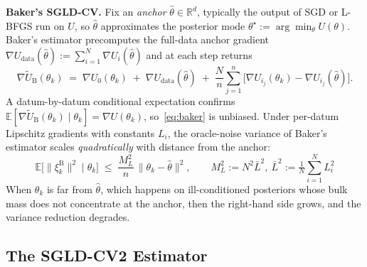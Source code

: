 \textbf{Baker's SGLD-CV.} Fix an \emph{anchor} $\hat\theta\in\mathbb R^d$, typically the output of SGD or L-BFGS run on $U$, so $\hat\theta$ approximates the posterior mode $\theta^\star:=\arg\min_\theta U(\theta)$. Baker's estimator precomputes the full-data anchor gradient $\nabla U_{\text{data}}(\hat\theta):=\sum_{i=1}^N\nabla U_i(\hat\theta)$ and at each step returns
\begin{equation}
  \nabla\tilde U_{\mathrm B}(\theta_k) \;=\; \nabla U_0(\theta_k) \;+\; \nabla U_{\text{data}}(\hat\theta) \;+\; \frac{N}{n}\sum_{j=1}^n\bigl[\nabla U_{i_j}(\theta_k) - \nabla U_{i_j}(\hat\theta)\bigr].
  \label{eq:baker}
\end{equation}
A datum-by-datum conditional expectation confirms $\mathbb E[\nabla\tilde U_{\mathrm B}(\theta_k)\mid\theta_k]=\nabla U(\theta_k)$, so~\eqref{eq:baker} is unbiased. Under per-datum Lipschitz gradients with constants $L_i$, the oracle-noise variance of Baker's estimator scales \emph{quadratically} with distance from the anchor:
\begin{equation}
  \mathbb E\bigl[\|\xi_k^{\mathrm B}\|^2\mid\theta_k\bigr] \;\le\; \frac{M_L^2}{n}\,\|\theta_k-\hat\theta\|^2, \qquad M_L^2:=N^2\bar L^2,\ \bar L^2:=\tfrac{1}{N}\sum_{i=1}^N L_i^2
  \label{eq:baker-var}
\end{equation}
When \(\theta_k\) is far from \(\hat\theta\), which happens on ill-conditioned posteriors whose bulk mass does not concentrate at the anchor, then the right-hand side grows, and the variance reduction degrades.

\subsection{The SGLD-CV2 Estimator}

